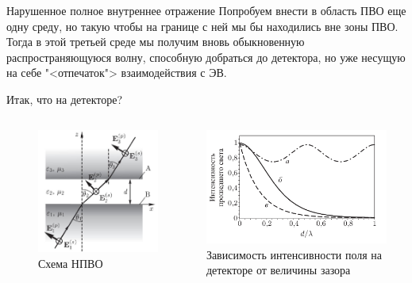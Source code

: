 \documentclass[9pt, compress, xcolor=table]{beamer}
\begin{document}
\begin{frame}{Нарушенное полное внутреннее отражение}
Попробуем внести в область ПВО еще одну среду, но такую чтобы на границе с ней мы бы находились вне зоны ПВО. Тогда в этой третьей среде мы получим вновь обыкновенную распространяющуюся волну, способную добраться до детектора, но уже несущую на себе "<отпечаток"> взаимодействия с ЭВ.

\end{frame}

\begin{frame}{Итак, что на детекторе?}

\begin{columns}[c]
\column{6.5cm}
\begin{center}
\begin{figure}
\centering
\includegraphics[width=0.9 \textwidth]{fig2_05}
\\\scriptsize{Схема НПВО}
\end{figure}
\end{center}
 
 \column{6.5cm}
\begin{center}
\includegraphics[width=0.9\textwidth]{fig2_14}
\\\scriptsize{Зависимость интенсивности поля на детекторе от величины зазора}
\end{center}
\end{columns}


\end{frame}
\end{document}
